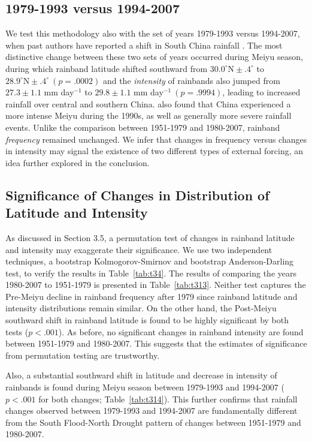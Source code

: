 \documentclass{ametsoc}
\begin{document}
\subsection{1979-1993 versus 1994-2007}
	
	We test this methodology also with the set of years 1979-1993 versus 1994-2007, when past authors have reported a shift in South China rainfall \citep{Kwon2007,Wu2010,Yim2013}. The most distinctive change between these two sets of years occurred during Meiyu season, during which rainband latitude shifted southward from $30.0^\circ \textrm{N} \pm .4^\circ$ to $28.9^\circ \textrm{N} \pm .4^\circ\ (p=.0002)$ and the \textit{intensity} of rainbands also jumped from $27.3 \pm 1.1$ mm day$^{-1}$ to $29.8 \pm 1.1$ mm day$^{-1}\ (p=.9994)$, leading to increased rainfall over central and southern China. \citet{Zou2015} also found that China experienced a more intense Meiyu during the 1990s, as well as generally more severe rainfall events. Unlike the comparison between 1951-1979 and 1980-2007, rainband \textit{frequency} remained unchanged. We infer that changes in frequency versus changes in intensity may signal the existence of two different types of external forcing, an idea further explored in the conclusion.
	
\subsection{Significance of Changes in Distribution of Latitude and Intensity}

	As discussed in Section 3.5, a permutation test of changes in rainband latitude and intensity may exaggerate their significance. We use two independent techniques, a bootstrap Kolmogorov-Smirnov and bootstrap Anderson-Darling test, to verify the results in Table~\ref{tab:t34}. The results of comparing the years 1980-2007 to 1951-1979 is presented in Table~\ref{tab:t313}. Neither test captures the Pre-Meiyu decline in rainband frequency after 1979 since rainband latitude and intensity distributions remain similar. On the other hand, the Post-Meiyu southward shift in rainband latitude is found to be highly significant by both tests ($p<.001$). As before, no significant changes in rainband intensity are found between 1951-1979 and 1980-2007. This suggests that the estimates of significance from permutation testing are trustworthy.

	Also, a substantial southward shift in latitude and decrease in intensity of rainbands is found during Meiyu season between 1979-1993 and 1994-2007 ($p<.001$ for both changes; Table~\ref{tab:t314}). This further confirms that rainfall changes observed between 1979-1993 and 1994-2007 are fundamentally different from the South Flood-North Drought pattern of changes between 1951-1979 and 1980-2007.
\end{document}
